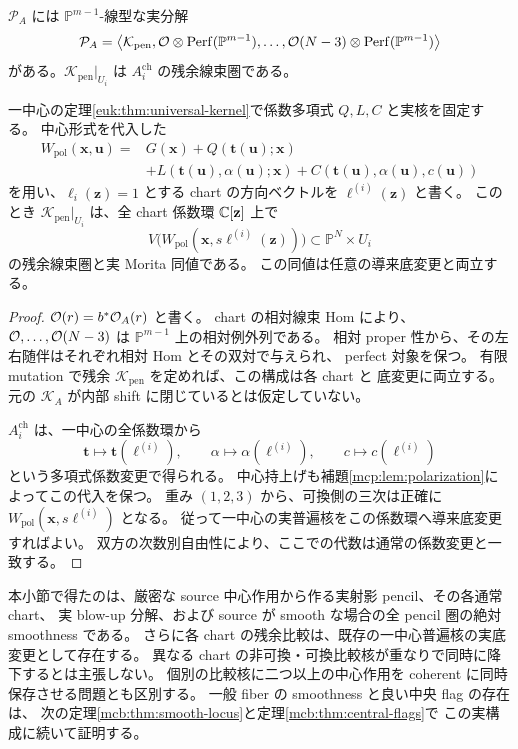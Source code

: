 \begin{corollary}
\label{mbl:cor:chart-kernel}
$\mathcal P_A$ には $\mathbb P^{m-1}$-線型な実分解
\[
 \mathcal P_A
  =\left\langle\mathcal K_{\mathrm{pen}},
     \mathcal O\otimes\operatorname{Perf}(\mathbb P^{m-1}),\ldots,
     \mathcal O(N-3)\otimes\operatorname{Perf}(\mathbb P^{m-1})\right\rangle
\]
がある。$\mathcal K_{\mathrm{pen}}|_{U_i}$ は $A_i^{\mathrm{ch}}$ の残余線束圏である。

一中心の定理\ref{euk:thm:universal-kernel}で係数多項式 $Q,L,C$ と実核を固定する。
中心形式を代入した
\[
 \begin{split}
 W_{\mathrm{pol}}(\mathbf x,\mathbf u)
   ={}&G(\mathbf x)+Q(\mathbf t(\mathbf u);\mathbf x)\\
     &+L(\mathbf t(\mathbf u),\alpha(\mathbf u);\mathbf x)
      +C(\mathbf t(\mathbf u),\alpha(\mathbf u),c(\mathbf u))
 \end{split}
\]
を用い、$\ell_i(\mathbf z)=1$ とする chart の方向ベクトルを
$\boldsymbol\ell^{(i)}(\mathbf z)$ と書く。
このとき $\mathcal K_{\mathrm{pen}}|_{U_i}$ は、全 chart 係数環 $\mathbb C[\mathbf z]$ 上で
\[
       V\bigl(W_{\mathrm{pol}}(\mathbf x,s\boldsymbol\ell^{(i)}(\mathbf z))\bigr)
            \subset\mathbb P^N\times U_i
\]
の残余線束圏と実 Morita 同値である。
この同値は任意の導来底変更と両立する。
\end{corollary}

\begin{proof}
$\mathcal O(r)=b^*\mathcal O_A(r)$ と書く。
chart の相対線束 Hom により、$\mathcal O,\ldots,\mathcal O(N-3)$ は
$\mathbb P^{m-1}$ 上の相対例外列である。
相対 proper 性から、その左右随伴はそれぞれ相対 Hom とその双対で与えられ、
perfect 対象を保つ。
有限 mutation で残余 $\mathcal K_{\mathrm{pen}}$ を定めれば、この構成は各 chart と
底変更に両立する。
元の $\mathcal K_A$ が内部 shift に閉じているとは仮定していない。

$A_i^{\mathrm{ch}}$ は、一中心の全係数環から
\[
 \mathbf t\longmapsto\mathbf t(\boldsymbol\ell^{(i)}),\qquad
 \alpha\longmapsto\alpha(\boldsymbol\ell^{(i)}),\qquad
 c\longmapsto c(\boldsymbol\ell^{(i)})
\]
という多項式係数変更で得られる。
中心持上げも補題\ref{mcp:lem:polarization}によってこの代入を保つ。
重み $(1,2,3)$ から、可換側の三次は正確に
$W_{\mathrm{pol}}(\mathbf x,s\boldsymbol\ell^{(i)})$ となる。
従って一中心の実普遍核をこの係数環へ導来底変更すればよい。
双方の次数別自由性により、ここでの代数は通常の係数変更と一致する。
\end{proof}

\begin{remark}[構成した範囲]
\label{mbl:rem:scope}
本小節で得たのは、厳密な source 中心作用から作る実射影 pencil、その各通常 chart、
実 blow-up 分解、および source が smooth な場合の全 pencil 圏の絶対 smoothness である。
さらに各 chart の残余比較は、既存の一中心普遍核の実底変更として存在する。
異なる chart の非可換・可換比較核が重なりで同時に降下するとは主張しない。
個別の比較核に二つ以上の中心作用を coherent に同時保存させる問題とも区別する。
一般 fiber の smoothness と良い中央 flag の存在は、
次の定理\ref{mcb:thm:smooth-locus}と定理\ref{mcb:thm:central-flags}で
この実構成に続いて証明する。
\end{remark}
